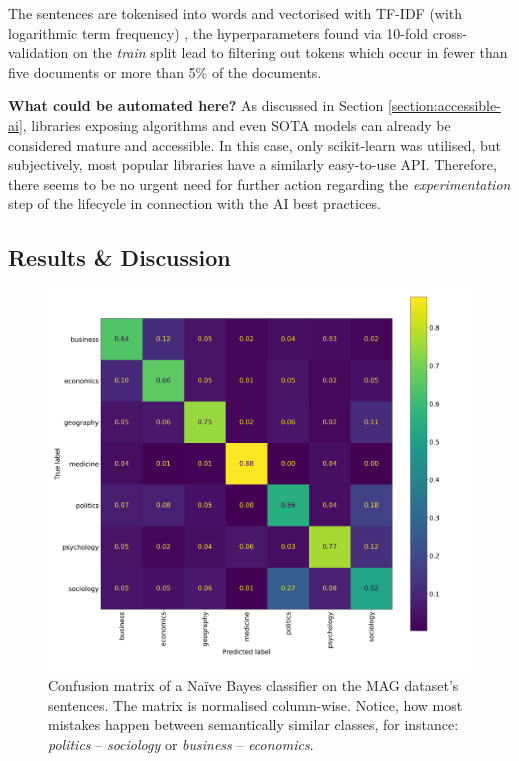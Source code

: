 The sentences are tokenised into words and vectorised with TF-IDF (with logarithmic term frequency) \cite{buckley1985implementation}, the hyperparameters found via 10-fold cross-validation on the \textit{train} split lead to filtering out tokens which occur in fewer than five documents or more than 5\% of the documents.

\begin{displayquote}
\textbf{What could be automated here?} As discussed in Section \ref{section:accessible-ai}, libraries exposing algorithms and even SOTA models can already be considered mature and accessible. In this case, only scikit-learn was utilised, but subjectively, most popular libraries have a similarly easy-to-use API. Therefore, there seems to be no urgent need for further action regarding the \textit{experimentation} step of the lifecycle in connection with the AI best practices.
\end{displayquote}

\subsection{Results \& Discussion}

\begin{figure}
    \centering
    \includegraphics[width=0.8\linewidth]{figures/mag-confusion.png}
    \captionsetup{width=.9\linewidth}
    \caption{Confusion matrix of a Naïve Bayes classifier on the MAG dataset's sentences. The matrix is normalised column-wise. Notice, how most mistakes happen between semantically similar classes, for instance: \textit{politics} -- \textit{sociology} or \textit{business} -- \textit{economics}.}
    \label{fig:mag-confusion}
\end{figure}

